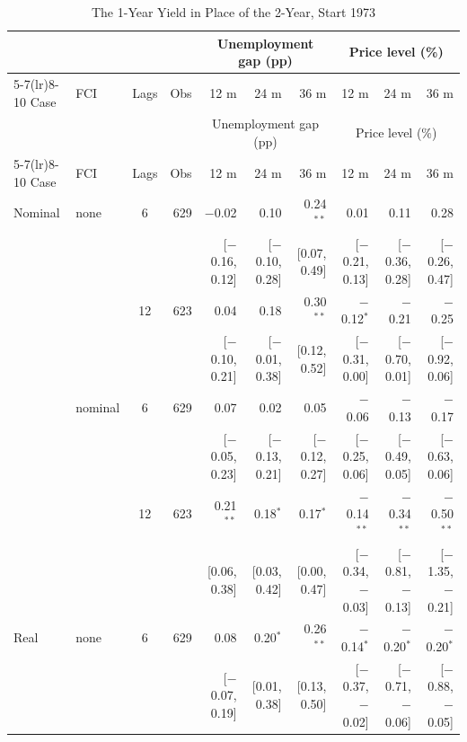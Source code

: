 \begingroup\scriptsize\setlength{\tabcolsep}{0.9pt}
\begin{longtable}{llcrrrrrrr}
\caption{The 1-Year Yield in Place of the 2-Year, Start 1973}\label{tab:appA473}\\
\toprule
 & & & & \multicolumn{3}{c}{Unemployment gap (pp)} & \multicolumn{3}{c}{Price level (\%)}\\ \cmidrule(lr){5-7}\cmidrule(lr){8-10}
Case & FCI & Lags & Obs & 12 m & 24 m & 36 m & 12 m & 24 m & 36 m\\
\midrule\endfirsthead
\toprule
 & & & & \multicolumn{3}{c}{Unemployment gap (pp)} & \multicolumn{3}{c}{Price level (\%)}\\ \cmidrule(lr){5-7}\cmidrule(lr){8-10}
Case & FCI & Lags & Obs & 12 m & 24 m & 36 m & 12 m & 24 m & 36 m\\
\midrule\endhead
\bottomrule\endfoot
Nominal & none & 6 & 629 & $-$0.02 & 0.10 & 0.24$^{**}$ & 0.01 & 0.11 & 0.28\\
 & & & & {\scriptsize [$-$0.16, 0.12]} & {\scriptsize [$-$0.10, 0.28]} & {\scriptsize [0.07, 0.49]} & {\scriptsize [$-$0.21, 0.13]} & {\scriptsize [$-$0.36, 0.28]} & {\scriptsize [$-$0.26, 0.47]}\\
 &  & 12 & 623 & 0.04 & 0.18 & 0.30$^{**}$ & $-$0.12$^{*}$ & $-$0.21 & $-$0.25\\
 & & & & {\scriptsize [$-$0.10, 0.21]} & {\scriptsize [$-$0.01, 0.38]} & {\scriptsize [0.12, 0.52]} & {\scriptsize [$-$0.31, 0.00]} & {\scriptsize [$-$0.70, 0.01]} & {\scriptsize [$-$0.92, 0.06]}\\
 & nominal & 6 & 629 & 0.07 & 0.02 & 0.05 & $-$0.06 & $-$0.13 & $-$0.17\\
 & & & & {\scriptsize [$-$0.05, 0.23]} & {\scriptsize [$-$0.13, 0.21]} & {\scriptsize [$-$0.12, 0.27]} & {\scriptsize [$-$0.25, 0.06]} & {\scriptsize [$-$0.49, 0.05]} & {\scriptsize [$-$0.63, 0.06]}\\
 &  & 12 & 623 & 0.21$^{**}$ & 0.18$^{*}$ & 0.17$^{*}$ & $-$0.14$^{**}$ & $-$0.34$^{**}$ & $-$0.50$^{**}$\\
 & & & & {\scriptsize [0.06, 0.38]} & {\scriptsize [0.03, 0.42]} & {\scriptsize [0.00, 0.47]} & {\scriptsize [$-$0.34, $-$0.03]} & {\scriptsize [$-$0.81, $-$0.13]} & {\scriptsize [$-$1.35, $-$0.21]}\\
\addlinespace
Real & none & 6 & 629 & 0.08 & 0.20$^{*}$ & 0.26$^{**}$ & $-$0.14$^{*}$ & $-$0.20$^{*}$ & $-$0.20$^{*}$\\
 & & & & {\scriptsize [$-$0.07, 0.19]} & {\scriptsize [0.01, 0.38]} & {\scriptsize [0.13, 0.50]} & {\scriptsize [$-$0.37, $-$0.02]} & {\scriptsize [$-$0.71, $-$0.06]} & {\scriptsize [$-$0.88, $-$0.05]}\\

\end{longtable}
